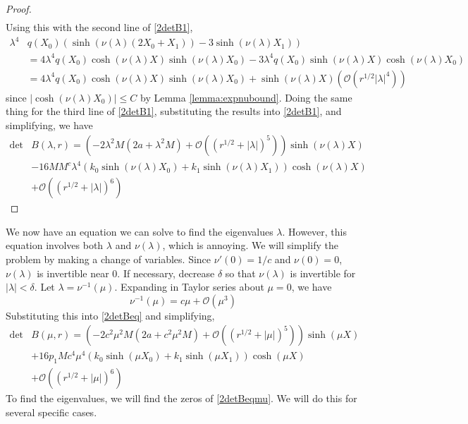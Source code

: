 \documentclass[thesis.tex]{subfiles}
\begin{document}
\begin{lemma}
\begin{proof}
\begin{align*}
\end{align*}
Using this with the second line of \cref{2detB1}, 
\begin{align*}
\lambda^4 &q(X_0) \left( \sinh(\nu(\lambda)(2 X_0 + X_1)) - 3 \sinh(\nu(\lambda)X_1)  \right) \\
&= 4 \lambda^4 q(X_0) \cosh(\nu(\lambda)X)\sinh(\nu(\lambda)X_0) - 3 \lambda^4 q(X_0) \sinh(\nu(\lambda)X)\cosh(\nu(\lambda)X_0) \\
&= 4 \lambda^4 q(X_0) \cosh(\nu(\lambda)X)\sinh(\nu(\lambda)X_0) + \sinh(\nu(\lambda)X)(\mathcal{O}(r^{1/2}|\lambda|^4))
\end{align*}
since $|\cosh(\nu(\lambda)X_0)|\leq C$ by Lemma \ref{lemma:expnubound}. Doing the same thing for the third line of \cref{2detB1}, substituting the results into \cref{2detB1}, and simplifying, we have
\begin{equation*}
\begin{aligned}
\det &B(\lambda, r) = \left(-2 \lambda^2 M (2a + \lambda^2 M) + \mathcal{O}( (r^{1/2} + |\lambda|)^5 )\right) \sinh(\nu(\lambda)X) \\
&-16 M M^c \lambda^4 ( k_0\sinh(\nu(\lambda)X_0) + k_1 \sinh(\nu(\lambda)X_1) ) \cosh(\nu(\lambda)X)  \\
&+ \mathcal{O}( (r^{1/2} + |\lambda|)^6) 
\end{aligned}
\end{equation*}
\end{proof}
\end{lemma}

We now have an equation we can solve to find the eigenvalues $\lambda$. However, this equation involves both $\lambda$ and $\nu(\lambda)$, which is annoying. We will simplify the problem by making a change of variables. Since $\nu'(0) = 1/c$ and $\nu(0) = 0$, $\nu(\lambda)$ is invertible near 0. If necessary, decrease $\delta$ so that $\nu(\lambda)$ is invertible for $|\lambda| < \delta$. Let $\lambda = \nu^{-1}(\mu)$. Expanding in Taylor series about $\mu = 0$, we have
\[
\nu^{-1}(\mu) = c \mu + \mathcal{O}(\mu^3)
\]
Substituting this into \cref{2detBeq} and simplifying, 
\begin{equation}\label{2detBeqmu}
\begin{aligned}
\det &B(\mu, r) = \left(-2 c^2 \mu^2 M (2a + c^2 \mu^2 M) +  \mathcal{O}( (r^{1/2} + |\mu|)^5 )\right) \sinh(\mu X) \\
&+16 p_1 M c^4 \mu^4 ( k_0\sinh(\mu X_0) + k_1 \sinh(\mu X_1) ) \cosh(\mu X)  \\
&+ \mathcal{O}( (r^{1/2} + |\mu|)^6) 
\end{aligned}
\end{equation}
To find the eigenvalues, we will find the zeros of \cref{2detBeqmu}. We will do this for several specific cases.
\end{document}
